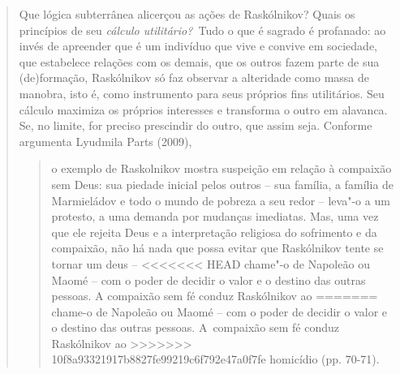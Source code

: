 {\begin{quote}
Que lógica subterrânea alicerçou as ações de Raskólnikov? Quais os
princípios de seu \emph{cálculo utilitário?~}Tudo o que é sagrado é
profanado: ao invés de apreender que é um indivíduo que vive e convive
em sociedade, que estabelece relações com os demais, que os outros fazem
parte de sua (de)formação, Raskólnikov só faz observar a alteridade como
massa de manobra, isto é, como instrumento para seus próprios fins
utilitários. Seu cálculo maximiza os próprios interesses e transforma o
outro em alavanca. Se, no limite, for preciso prescindir do outro, que
assim seja. Conforme argumenta Lyudmila Parts (2009),

\begin{quote}
o exemplo de Raskolnikov mostra suspeição em relação à compaixão sem
Deus: sua piedade inicial pelos outros -- sua família, a família de
Marmieládov e todo o mundo de pobreza a seu redor -- leva"-o a um
protesto, a uma demanda por mudanças imediatas. Mas, uma vez que ele
rejeita Deus e a interpretação religiosa do sofrimento e da compaixão,
não há nada que possa evitar que Raskólnikov tente se tornar um deus --
<<<<<<< HEAD
chame"-o de Napoleão ou Maomé -- com o poder de decidir o valor e o
destino das outras pessoas. A compaixão sem fé conduz Raskólnikov ao
=======
chame-o de Napoleão ou Maomé -- com o poder de decidir o valor e o
destino das outras pessoas. A~compaixão sem fé conduz Raskólnikov ao
>>>>>>> 10f8a93321917b8827fe99219c6f792e47a0f7fe
homicídio (pp. 70-71).
\end{quote}


\end{quote}}
